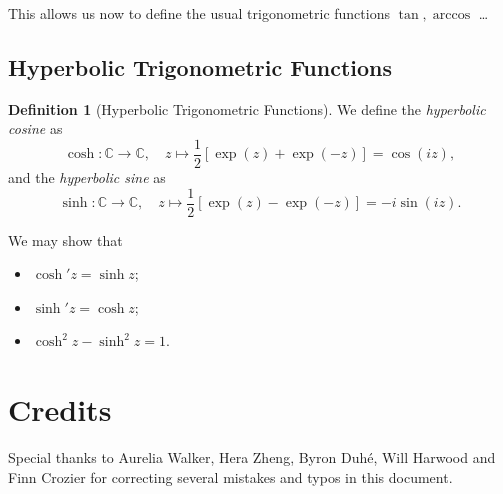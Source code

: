 \documentclass[11pt]{article}
\numberwithin{equation}{section}
\theoremstyle{definition}
\newtheorem{definition}[theorem]{Definition}
\theoremstyle{remark}
\newcommand{\pqty}[1]{\left(#1\right)}
\newcommand{\bqty}[1]{\left[#1\right]}
\newcommand{\function}[5]{#1:#2\to #3,\quad #4\mapsto #5}
\newcommand{\CC}{\mathbb C}
\begin{document}
This allows us now to define the usual trigonometric functions \(\tan, \arccos\) \dots

\subsection{Hyperbolic Trigonometric Functions}

\begin{definition}[Hyperbolic Trigonometric Functions]\label{analysis-unit-0235}
    We define the \emph{hyperbolic cosine} as
    \[
        \function{\cosh}{\CC}{\CC}{z}{\frac{1}{2} \bqty{\exp \pqty{z} + \exp \pqty{-z}} = \cos \pqty{iz},}
    \]
    and the \emph{hyperbolic sine} as 
    \[
        \function{\sinh}{\CC}{\CC}{z}{\frac{1}{2} \bqty{\exp \pqty{z} - \exp \pqty{-z}} = - i \sin \pqty{iz}.}
    \]
\end{definition}

We may show that
\begin{itemize}
    \item \(\cosh' z = \sinh z\);
    \item \(\sinh' z = \cosh z\);
    \item \(\cosh^2 z - \sinh^2 z = 1\).
\end{itemize}

\appendix
\section{Credits}

Special thanks to Aurelia Walker, Hera Zheng, Byron Duh\'{e}, Will Harwood and Finn Crozier for correcting several mistakes and typos in this document.
\end{document}
